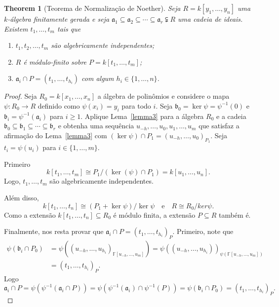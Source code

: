 \documentclass[12pt]{amsart}
\renewcommand{\a}{\mathfrak a}
\renewcommand{\b}{\mathfrak b}
\newcommand{\F}{\mathbb F}
\newtheorem{theorem}{Theorem}
\begin{document}
\begin{theorem}[Teorema de Normalização de Noether]
    Seja $R=k[y_1,\ldots,y_n]$ uma $k$-álgebra finitamente gerada e seja $\a_1\subseteq \a_2\subseteq \cdots\subseteq \a_r\subsetneqq R$ uma cadeia de ideais. Existem 
    $t_1,\ldots,t_m$ tais que 
    \begin{enumerate}
        \item $t_1,t_2,\ldots,t_m$ são algebricamente independentes;
        \item $R$ é módulo-finito sobre $P=k[t_1,\ldots,t_m]$;
        \item $\a_i\cap P = (t_1,\ldots,t_{h_i})$ com algum $h_i\in\{1,\ldots,n\}$.
    \end{enumerate} 
\end{theorem}
\begin{proof}
    Seja $R_0=k[x_1,\ldots,x_n]$ a álgebra de polinômios e considere o mapa $\psi:R_0\to R$ definido como 
    $\psi(x_i)=y_i$ para todo $i$. Seja $\b_0=\ker\psi=\psi^{-1}(0)$ e $\b_i=\psi^{-1}(\a_i)$ para $i\geq 1$. 
    Aplique Lema~\ref{lemma3} para a álgebra $R_0$ e a cadeia $\b_0\subseteq \b_1\subseteq \cdots\subseteq \b_r$ e obtenha uma sequência $u_{-h},\ldots,u_0,u_1,\ldots,u_m$ que satisfaz a 
    afirmação do Lema~\ref{lemma3} com $(\ker \psi)\cap P_1=(u_{-h},\ldots,u_0)_{P_1}$. 
    Seja $t_i=\psi(u_i)$ para $i\in\{1,\ldots,m\}$. 

    Primeiro 
    \[
        k[t_1,\ldots,t_m]\cong P_1/(\ker(\psi)\cap P_1)=k[u_1,\ldots,u_n]. 
    \]
    Logo, $t_1,\ldots,t_m$ são algebricamente independentes.

    Além disso, 
    \[
        k[t_1,\ldots,t_n]\cong (P_1+\ker\psi)/\ker\psi\quad\mbox{e}\quad 
        R\cong R_0/ker\psi.  
    \]
    Como a extensão $k[t_1,\ldots,t_n]\subseteq R_0$ é módulo finita, a extensão $P\subseteq R$ também é.

    Finalmente, nos resta provar que $\a_i\cap P=(t_1,\ldots,t_{h_i})_P$. 
Primeiro, note que    
\begin{align*}
        \psi(\b_i\cap P_0)&=\psi((u_{-h},\ldots,u_{h_i})_{\F[u_{-h},\ldots,u_m]})=
        \psi((u_{-h},\ldots,u_{h_i}))_{\psi(\F[u_{-h},\ldots,u_m])}\\&=
        (t_1,\ldots,t_{h_i})_{P}.
    \end{align*}
    Logo
    \[
        \a_i\cap P=\psi(\psi^{-1}(\a_i\cap P))=\psi(\psi^{-1}(\a_i)\cap \psi^{-1}(P))=
        \psi(\b_i\cap P_0)=(t_1,\ldots,t_{h_i})_{P}.
    \]
\end{proof}
\end{document}
